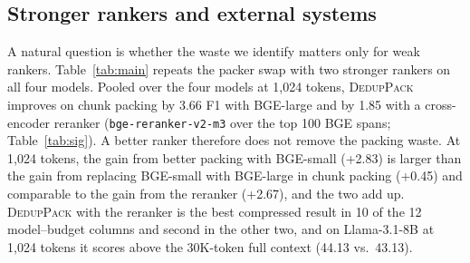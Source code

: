 \documentclass[11pt]{article}
\newcommand{\spk}{\textsc{DedupPack}}
\begin{document}
\subsection{Stronger rankers and external systems}
\label{sec:external}

A natural question is whether the waste we identify matters only for weak rankers. Table~\ref{tab:main} repeats the packer swap with two stronger rankers on all four models. Pooled over the four models at 1,024 tokens, \spk{} improves on chunk packing by 3.66 F1 with BGE-large and by 1.85 with a cross-encoder reranker (\texttt{bge-reranker-v2-m3} over the top 100 BGE spans; Table~\ref{tab:sig}). A better ranker therefore does not remove the packing waste. At 1,024 tokens, the gain from better packing with BGE-small (+2.83) is larger than the gain from replacing BGE-small with BGE-large in chunk packing (+0.45) and comparable to the gain from the reranker (+2.67), and the two add up. \spk{} with the reranker is the best compressed result in 10 of the 12 model--budget columns and second in the other two, and on Llama-3.1-8B at 1,024 tokens it scores above the 30K-token full context (44.13 vs.\ 43.13).
\end{document}
